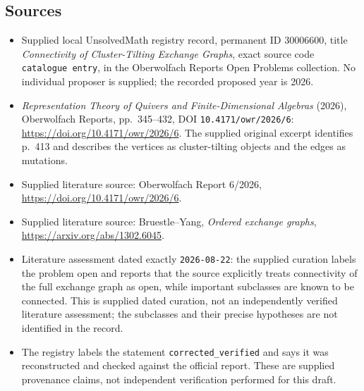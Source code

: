 \documentclass[11pt]{article}
\begin{document}
\subsection{Sources}
\begin{itemize}
\item Supplied local UnsolvedMath registry record, permanent ID \(30006600\), title \emph{Connectivity of Cluster-Tilting Exchange Graphs}, exact source code \texttt{catalogue entry}, in the Oberwolfach Reports Open Problems collection. No individual proposer is supplied; the recorded proposed year is 2026.
\item \emph{Representation Theory of Quivers and Finite-Dimensional Algebras} (2026), Oberwolfach Reports, pp.\ 345--432, DOI \texttt{10.4171/owr/2026/6}: \url{https://doi.org/10.4171/owr/2026/6}. The supplied original excerpt identifies p.\ 413 and describes the vertices as cluster-tilting objects and the edges as mutations.
\item Supplied literature source: Oberwolfach Report 6/2026, \url{https://doi.org/10.4171/owr/2026/6}.
\item Supplied literature source: Bruestle--Yang, \emph{Ordered exchange graphs}, \url{https://arxiv.org/abs/1302.6045}.
\item Literature assessment dated exactly \texttt{2026-08-22}: the supplied curation labels the problem open and reports that the source explicitly treats connectivity of the full exchange graph as open, while important subclasses are known to be connected. This is supplied dated curation, not an independently verified literature assessment; the subclasses and their precise hypotheses are not identified in the record.
\item The registry labels the statement \texttt{corrected\_verified} and says it was reconstructed and checked against the official report. These are supplied provenance claims, not independent verification performed for this draft.
\end{itemize}
\end{document}
